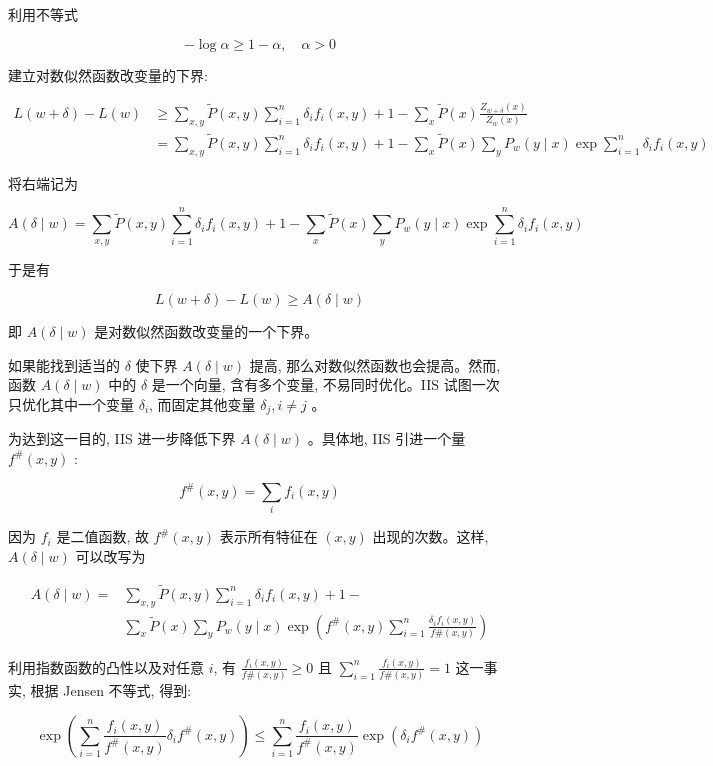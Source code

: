 \documentclass[10pt]{article}
\begin{document}
\begin{CJK*}{UTF8}{bsmi}
利用不等式

$$
-\log \alpha \geqslant 1-\alpha, \quad \alpha>0
$$

建立对数似然函数改变量的下界:

$$
\begin{aligned}
L(w+\delta)-L(w) & \geqslant \sum_{x, y} \tilde{P}(x, y) \sum_{i=1}^{n} \delta_{i} f_{i}(x, y)+1-\sum_{x} \tilde{P}(x) \frac{Z_{w+\delta}(x)}{Z_{w}(x)} \\
& =\sum_{x, y} \tilde{P}(x, y) \sum_{i=1}^{n} \delta_{i} f_{i}(x, y)+1-\sum_{x} \tilde{P}(x) \sum_{y} P_{w}(y \mid x) \exp \sum_{i=1}^{n} \delta_{i} f_{i}(x, y)
\end{aligned}
$$

将右端记为

$$
A(\delta \mid w)=\sum_{x, y} \tilde{P}(x, y) \sum_{i=1}^{n} \delta_{i} f_{i}(x, y)+1-\sum_{x} \tilde{P}(x) \sum_{y} P_{w}(y \mid x) \exp \sum_{i=1}^{n} \delta_{i} f_{i}(x, y)
$$

于是有

$$
L(w+\delta)-L(w) \geqslant A(\delta \mid w)
$$

即 $A(\delta \mid w)$ 是对数似然函数改变量的一个下界。

如果能找到适当的 $\delta$ 使下界 $A(\delta \mid w)$ 提高, 那么对数似然函数也会提高。然而, 函数 $A(\delta \mid w)$ 中的 $\delta$ 是一个向量, 含有多个变量, 不易同时优化。IIS 试图一次只优化其中一个变量 $\delta_{i}$, 而固定其他变量 $\delta_{j}, i \neq j$ 。

为达到这一目的, IIS 进一步降低下界 $A(\delta \mid w)$ 。具体地, IIS 引进一个量 $f^{\#}(x, y)$ :

$$
f^{\#}(x, y)=\sum_{i} f_{i}(x, y)
$$

因为 $f_{i}$ 是二值函数, 故 $f^{\#}(x, y)$ 表示所有特征在 $(x, y)$ 出现的次数。这样, $A(\delta \mid w)$ 可以改写为


\begin{align*}
A(\delta \mid w)= & \sum_{x, y} \tilde{P}(x, y) \sum_{i=1}^{n} \delta_{i} f_{i}(x, y)+1- \\
& \sum_{x} \tilde{P}(x) \sum_{y} P_{w}(y \mid x) \exp \left(f^{\#}(x, y) \sum_{i=1}^{n} \frac{\delta_{i} f_{i}(x, y)}{f \#(x, y)}\right) \tag{6.30}
\end{align*}


利用指数函数的凸性以及对任意 $i$, 有 $\frac{f_{i}(x, y)}{f \#(x, y)} \geqslant 0$ 且 $\sum_{i=1}^{n} \frac{f_{i}(x, y)}{f \#(x, y)}=1$ 这一事实, 根据 Jensen 不等式, 得到:

$$
\exp \left(\sum_{i=1}^{n} \frac{f_{i}(x, y)}{f^{\#}(x, y)} \delta_{i} f^{\#}(x, y)\right) \leqslant \sum_{i=1}^{n} \frac{f_{i}(x, y)}{f^{\#}(x, y)} \exp \left(\delta_{i} f^{\#}(x, y)\right)
$$


\end{CJK*}
\end{document}
